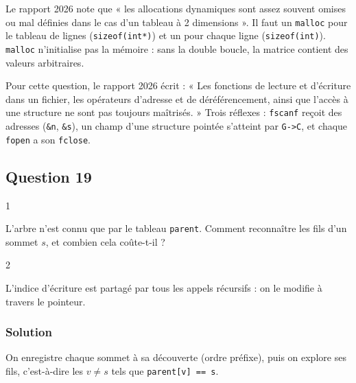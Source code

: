 \documentclass[11pt,a4paper]{article}
\begin{document}
\begin{piege}

Le rapport 2026 note que « les allocations dynamiques sont assez souvent omises ou mal définies dans le cas d'un tableau à 2 dimensions ». Il faut un \texttt{malloc} pour le tableau de lignes (\texttt{sizeof(int*)}) et un pour chaque ligne (\texttt{sizeof(int)}). \texttt{malloc} n'initialise pas la mémoire : sans la double boucle, la matrice contient des valeurs arbitraires.

\end{piege}

\begin{jury}

Pour cette question, le rapport 2026 écrit : « Les fonctions de lecture et d'écriture dans un fichier, les opérateurs d'adresse et de déréférencement, ainsi que l'accès à une structure ne sont pas toujours maîtrisés. » Trois réflexes : \texttt{fscanf} reçoit des adresses (\texttt{\&n}, \texttt{\&s}), un champ d'une structure pointée s'atteint par \texttt{G-\textgreater{}C}, et chaque \texttt{fopen} a son \texttt{fclose}.

\end{jury}

\hypertarget{question-19}{%
\subsection{Question 19}\label{question-19}}

\begin{indication}{1}

L'arbre n'est connu que par le tableau \texttt{parent}. Comment reconnaître les fils d'un sommet \(s\), et combien cela coûte-t-il ?

\end{indication}

\begin{indication}{2}

L'indice d'écriture est partagé par tous les appels récursifs : on le modifie à travers le pointeur.

\end{indication}

\hypertarget{solution-18}{%
\subsubsection{Solution}\label{solution-18}}

On enregistre chaque sommet à sa découverte (ordre préfixe), puis on explore ses fils, c'est-à-dire les \(v\neq s\) tels que \texttt{parent{[}v{]}\ ==\ s}.
\end{document}
